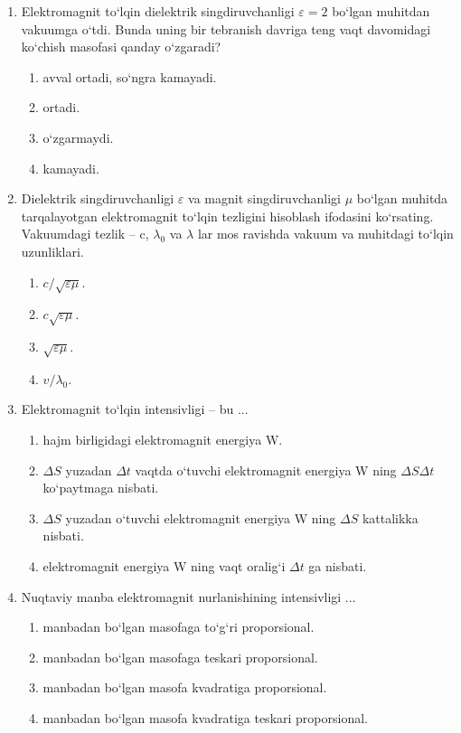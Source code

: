 \begin{enumerate}
\item Elektromagnit to‘lqin dielektrik singdiruvchanligi $\varepsilon=2$ bo‘lgan muhitdan vakuumga o‘tdi. Bunda uning bir tebranish davriga teng vaqt davomidagi ko‘chish masofasi qanday o‘zgaradi?
\begin{enumerate}[label=\Alph*)]
\item avval ortadi, so‘ngra kamayadi.
\item ortadi.
\item o‘zgarmaydi.
\item kamayadi.
\end{enumerate}

\item Dielektrik singdiruvchanligi $\varepsilon$ va magnit singdiruvchanligi $\mu$ bo‘lgan muhitda tarqalayotgan elektromagnit to‘lqin tezligini hisoblash ifodasini ko‘rsating. Vakuumdagi tezlik – c, $\lambda_0$ va $\lambda$ lar mos ravishda vakuum va muhitdagi to‘lqin uzunliklari.
\begin{enumerate}[label=\Alph*)]
\item $c/\sqrt{\varepsilon\mu}$.
\item $c\sqrt{\varepsilon\mu}$.
\item $\sqrt{\varepsilon\mu}$.
\item $v/\lambda_0$.
\end{enumerate}

\item Elektromagnit to‘lqin intensivligi – bu ...
\begin{enumerate}[label=\Alph*)]
\item hajm birligidagi elektromagnit energiya W.
\item $\Delta S$ yuzadan $\Delta t$ vaqtda o‘tuvchi elektromagnit energiya W ning $\Delta S \Delta t$ ko‘paytmaga nisbati.
\item $\Delta S$ yuzadan o‘tuvchi elektromagnit energiya W ning $\Delta S$ kattalikka nisbati.
\item elektromagnit energiya W ning vaqt oralig‘i $\Delta t$ ga nisbati.
\end{enumerate}

\item Nuqtaviy manba elektromagnit nurlanishining intensivligi ...
\begin{enumerate}[label=\Alph*)]
\item manbadan bo‘lgan masofaga to‘g‘ri proporsional.
\item manbadan bo‘lgan masofaga teskari proporsional.
\item manbadan bo‘lgan masofa kvadratiga proporsional.
\item manbadan bo‘lgan masofa kvadratiga teskari proporsional.
\end{enumerate}


\end{enumerate}
